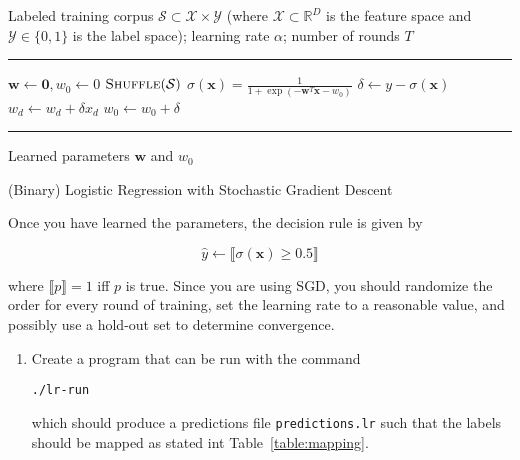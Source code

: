 \documentclass[12pt,letterpaper]{article}
\begin{document}
\begin{enumerate}
\begin{algorithm}[htb]
\begin{algorithmic}
    Labeled training corpus $\mathcal{S} \subset \mathcal{X} \times \mathcal{Y}$ (where $\mathcal{X} \subset \mathbb{R}^D$ is the feature space and  $\mathcal{Y} \in \{0,1\}$ is the label space); learning rate $\alpha$; number of rounds $T$
   \vspace{0.5em}
   \hrule
   \vspace{0.5em}
   \STATE $\mathbf{w} \leftarrow \mathbf{0}, w_0 \leftarrow 0$
   \STATE {}
      \STATE $\textsc{Shuffle}(\mathcal{S})$
         \STATE $\sigma(\mathbf{x}) = \frac{1}{1 + \exp(-\mathbf{w}^T\mathbf{x} - w_0)}$
         \STATE $\delta \leftarrow y - \sigma(\mathbf{x})$
         \STATE {}
            \STATE $w_d \leftarrow w_d + \delta x_d$
         \ENDFOR
         \STATE $w_0 \leftarrow w_0 + \delta$ 
      \ENDFOR
   \ENDFOR
   \vspace{0.5em}
   \hrule
   \vspace{0.5em}
    Learned parameters $\mathbf{w}$ and $w_0$ 
\caption{(Binary) Logistic Regression with Stochastic Gradient Descent}
\label{alg:lr}
\end{algorithmic}
\end{algorithm}

Once you have learned the parameters, the decision rule is given by

$$\hat{y} \leftarrow \llbracket  \sigma(\mathbf{x}) \geq 0.5 \rrbracket$$

where $\llbracket p \rrbracket = 1$ iff $p$ is true.  Since you are using SGD, you should randomize the order for every round of training, set the learning rate to a reasonable value, and possibly use a hold-out set to determine convergence.

\begin{enumerate}
\item
Create a program that can be run with the command

{\tt ./lr-run}

which should produce a predictions file {\tt predictions.lr} such that the labels should be mapped as stated int Table~\ref{table:mapping}.


\end{enumerate}
\end{enumerate}
\end{document}
